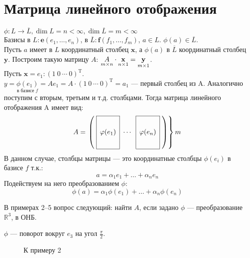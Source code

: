 \section{Матрица линейного отображения}
\noindent$\phi: L\rightarrow\overline{L}, \dim L=n<\infty, \dim \overline{L}=m<\infty$\\
Базисы в $L: \textbf{e} (e_1,\dots,e_n)$, в $\overline{L}: \textbf{f} (f_1,\dots,f_m)$, $a \in L$. $\phi(a) \in \overline{L}$.\\
Пусть $a$ имеет в $L$ координатный столбец $\textbf{x}$, а $\phi(a)$ в $\overline{L}$ координатный столбец $\textbf{y}$. Построим такую матрицу $A$: $\underset{m\times n} A\cdot \underset{n\times 1}{\text{\textbf{x}}}=\underset{m\times 1}{\text{\textbf{y}}}$.\\
Пусть $\textbf{x}=e_1: (1\ 0\ \cdots\ 0)^{\text{T}}$.\\
$y=\underset{\text{в базисе $f$}}{\phi(e_1)}=Ae_1=A\cdot (1\ 0\ \cdots\ 0)^{\text{T}}=a_1$ --- первый столбец из A. Аналогично поступим с вторым, третьим и т.д. столбцами. Тогда матрица линейного отображения A имеет вид:
$$A=
\left.\left(\hspace{1mm}
\begin{array}{|c|c|c|}
\cline{1-1} \cline{3-3}
\multirow{4}{*}{$\phi(e_1)$} & \multirow{4}{*}{$\cdots$} & \multirow{4}{*}{$\phi(e_n)$} \\
&                           &                              \\
&                           &                              \\
&                           &                              \\ \cline{1-1} \cline{3-3} 
\end{array}\hspace{1mm}\right) \right\}m
$$
В данном случае, столбцы матрицы --- это координатные столбцы $\phi(e_i)$ в базисе $f$ т.к.:
$$
a=\alpha_1 e_1+\dots+\alpha_n e_n
$$
Подействуем на него преобразованием $\phi$:
$$
\phi(a)=\alpha_1 \phi(e_1)+\dots+\alpha_n \phi(e_n)
$$

В примерах 2--5 вопрос следующий: найти $A$, если задано $\phi$ --- преобразование $\mathbb{R}^3$, в ОНБ.
\begin{prim}
	$\phi$ --- поворот вокруг $\textbf{$e_3$}$ на угол $\frac{\pi}{2}$.
\end{prim}

\begin{wrapfigure}{r}{0.27\linewidth}
	\def\svgwidth{3cm} %
	
	\caption{К примеру 2}
	\label{...}
	\vspace{-9cm}
\end{wrapfigure}

